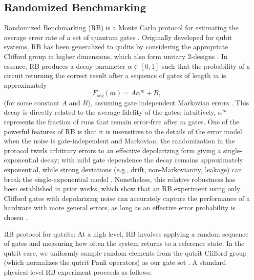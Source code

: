 \subsection{Randomized Benchmarking}
Randomized Benchmarking (RB) is a Monte Carlo protocol for estimating the average error rate of a set of quantum gates \cite{Magesan2011PRL,Knill2008,Emerson2005}. Originally developed for qubit systems, RB has been generalized to qudits by considering the appropriate Clifford group in higher dimensions, which also form unitary 2-designs \cite{Appleby2005,Dankert2009,Gross2007}. In essence, RB produces a decay parameter $\alpha \in [0,1]$ such that the probability of a circuit returning the correct result after a sequence of gates of length $m$ is approximately
\begin{equation}
F_{seq}(m) = A\alpha^{m} + B,
\label{eq:fseq}
\end{equation}
(for some constant $A$ and $B$), assuming gate independent Markovian errors \cite{Magesan2011PRL,Magesan2012PRA}. This decay is directly related to the average fidelity of the gates; intuitively, $\alpha^m$ represents the fraction of runs that remain error-free after $m$ gates. One of the powerful features of RB is that it is insensitive to the details of the error model when the noise is gate-independent and Markovian: the randomization in the protocol twirls arbitrary errors to an effective depolarizing form giving a single-exponential decay; with mild gate dependence the decay remains approximately exponential, while strong deviations (e.g., drift, non-Markovianity, leakage) can break the single-exponential model \cite{Emerson2005,Wallman2018}. Nonetheless, this relative robustness has been established in prior works, which show that an RB experiment using only Clifford gates with depolarizing noise can accurately capture the performance of a hardware with more general errors, as long as an effective error probability is chosen \cite{Magesan2011PRL,Proctor2019DRB}.

RB protocol for qutrits: At a high level, RB involves applying a random sequence of gates and measuring how often the system returns to a reference state. In the qutrit case, we uniformly sample random elements from the qutrit Clifford group (which normalizes the qutrit Pauli operators) as our gate set \cite{Appleby2005,Morvan2021}. A standard physical-level RB experiment proceeds as follows:

